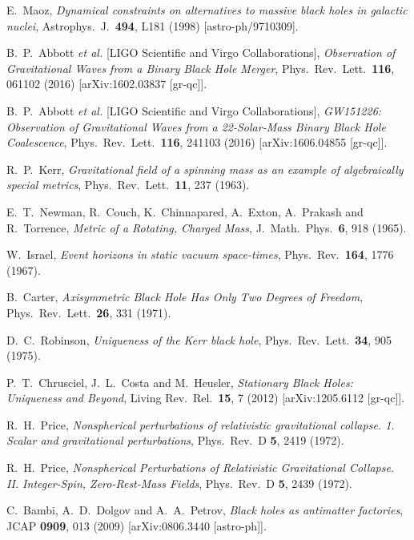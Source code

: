 \documentclass[11pt,a4paper,pdftex]{article}
\begin{document}
\begin{thebibliography}{99}
  E.~Maoz,
  {\it Dynamical constraints on alternatives to massive black holes in galactic nuclei},
  Astrophys.\ J.\  {\bf 494}, L181 (1998)
  [astro-ph/9710309].  
  
  B.~P.~Abbott {\it et al.} [LIGO Scientific and Virgo Collaborations],
  {\it Observation of Gravitational Waves from a Binary Black Hole Merger},
  Phys.\ Rev.\ Lett.\  {\bf 116}, 061102 (2016)
  [arXiv:1602.03837 [gr-qc]].

  B.~P.~Abbott {\it et al.} [LIGO Scientific and Virgo Collaborations],
  {\it GW151226: Observation of Gravitational Waves from a 22-Solar-Mass Binary Black Hole Coalescence},
  Phys.\ Rev.\ Lett.\  {\bf 116}, 241103 (2016)
  [arXiv:1606.04855 [gr-qc]].
  
  R.~P.~Kerr,
  {\it Gravitational field of a spinning mass as an example of algebraically special metrics},
  Phys.\ Rev.\ Lett.\  {\bf 11}, 237 (1963).  

  E.~T.~Newman, R.~Couch, K.~Chinnapared, A.~Exton, A.~Prakash and R.~Torrence,
  {\it Metric of a Rotating, Charged Mass},
  J.\ Math.\ Phys.\  {\bf 6}, 918 (1965).

  W.~Israel,
  {\it Event horizons in static vacuum space-times},
  Phys.\ Rev.\  {\bf 164}, 1776 (1967).

  B.~Carter,
  {\it Axisymmetric Black Hole Has Only Two Degrees of Freedom},
  Phys.\ Rev.\ Lett.\  {\bf 26}, 331 (1971).
  
  D.~C.~Robinson,
  {\it Uniqueness of the Kerr black hole},
  Phys.\ Rev.\ Lett.\  {\bf 34}, 905 (1975).

  P.~T.~Chrusciel, J.~L.~Costa and M.~Heusler,
  {\it Stationary Black Holes: Uniqueness and Beyond},
  Living Rev.\ Rel.\  {\bf 15}, 7 (2012)
  [arXiv:1205.6112 [gr-qc]].   

  R.~H.~Price,
  {\it Nonspherical perturbations of relativistic gravitational collapse. 1. Scalar and gravitational perturbations},
  Phys.\ Rev.\ D {\bf 5}, 2419 (1972).

  R.~H.~Price,
  {\it Nonspherical Perturbations of Relativistic Gravitational Collapse. II. Integer-Spin, Zero-Rest-Mass Fields},
  Phys.\ Rev.\ D {\bf 5}, 2439 (1972).
  
  C.~Bambi, A.~D.~Dolgov and A.~A.~Petrov,
  {\it Black holes as antimatter factories},
  JCAP {\bf 0909}, 013 (2009)
  [arXiv:0806.3440 [astro-ph]].


\end{thebibliography}
\end{document}
